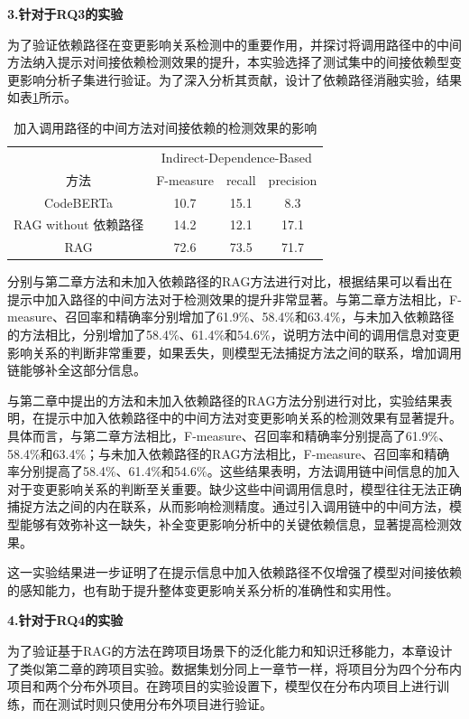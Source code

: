 \textbf{3.针对于RQ3的实验}

为了验证依赖路径在变更影响关系检测中的重要作用，并探讨将调用路径中的中间方法纳入提示对间接依赖检测效果的提升，本实验选择了测试集中的间接依赖型变更影响分析子集进行验证。为了深入分析其贡献，设计了依赖路径消融实验，结果如表\ref{2_消融实验}所示。

\begin{table}[htbp]
\caption{加入调用路径的中间方法对间接依赖的检测效果的影响}
\label{2_消融实验}
\vspace{0.5em}\centering\wuhao
\begin{tabular}{cccc }
\toprule
  & \multicolumn{3}{c}{Indirect-Dependence-Based}  \\
方法 & F-measure & recall & precision \\  
\midrule
CodeBERTa  &  10.7 & 15.1 & 8.3 \\
\midrule
RAG without 依赖路径  & 14.2 & 12.1 & 17.1 \\
RAG  & 72.6 & 73.5 & 71.7 \\
\bottomrule
\end{tabular}
\end{table}



分别与第二章方法和未加入依赖路径的RAG方法进行对比，根据结果可以看出在提示中加入路径的中间方法对于检测效果的提升非常显著。与第二章方法相比，F-measure、召回率和精确率分别增加了61.9\%、58.4\%和63.4\%，与未加入依赖路径的方法相比，分别增加了58.4\%、61.4\%和54.6\%，说明方法中间的调用信息对变更影响关系的判断非常重要，如果丢失，则模型无法捕捉方法之间的联系，增加调用链能够补全这部分信息。

与第二章中提出的方法和未加入依赖路径的RAG方法分别进行对比，实验结果表明，在提示中加入依赖路径中的中间方法对变更影响关系的检测效果有显著提升。具体而言，与第二章方法相比，F-measure、召回率和精确率分别提高了61.9\%、58.4\%和63.4\%；与未加入依赖路径的RAG方法相比，F-measure、召回率和精确率分别提高了58.4\%、61.4\%和54.6\%。这些结果表明，方法调用链中间信息的加入对于变更影响关系的判断至关重要。缺少这些中间调用信息时，模型往往无法正确捕捉方法之间的内在联系，从而影响检测精度。通过引入调用链中的中间方法，模型能够有效弥补这一缺失，补全变更影响分析中的关键依赖信息，显著提高检测效果。

这一实验结果进一步证明了在提示信息中加入依赖路径不仅增强了模型对间接依赖的感知能力，也有助于提升整体变更影响关系分析的准确性和实用性。

\textbf{4.针对于RQ4的实验}

为了验证基于RAG的方法在跨项目场景下的泛化能力和知识迁移能力，本章设计了类似第二章的跨项目实验。数据集划分同上一章节一样，将项目分为四个分布内项目和两个分布外项目。在跨项目的实验设置下，模型仅在分布内项目上进行训练，而在测试时则只使用分布外项目进行验证。


